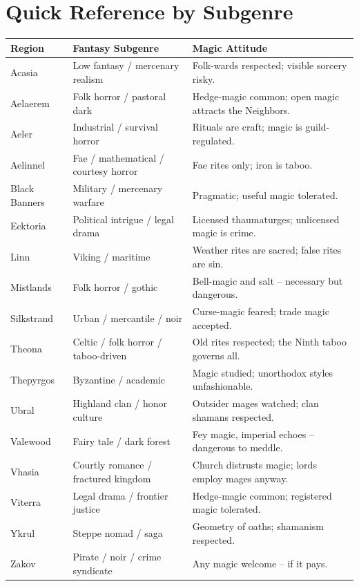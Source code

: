 \section*{Quick Reference by Subgenre}
{\small
\begin{longtable}{lll}
\toprule
\textbf{Region} & \textbf{Fantasy Subgenre} & \textbf{Magic Attitude} \\
\midrule
Acasia & Low fantasy / mercenary realism & Folk-wards respected; visible sorcery risky. \\
Aelaerem & Folk horror / pastoral dark & Hedge-magic common; open magic attracts the Neighbors. \\
Aeler & Industrial / survival horror & Rituals are craft; magic is guild-regulated. \\
Aelinnel & Fae / mathematical / courtesy horror & Fae rites only; iron is taboo. \\
Black Banners & Military / mercenary warfare & Pragmatic; useful magic tolerated. \\
Ecktoria & Political intrigue / legal drama & Licensed thaumaturges; unlicensed magic is crime. \\
Linn & Viking / maritime & Weather rites are sacred; false rites are sin. \\
Mistlands & Folk horror / gothic & Bell-magic and salt -- necessary but dangerous. \\
Silkstrand & Urban / mercantile / noir & Curse-magic feared; trade magic accepted. \\
Theona & Celtic / folk horror / taboo-driven & Old rites respected; the Ninth taboo governs all. \\
Thepyrgos & Byzantine / academic & Magic studied; unorthodox styles unfashionable. \\
Ubral & Highland clan / honor culture & Outsider mages watched; clan shamans respected. \\
Valewood & Fairy tale / dark forest & Fey magic, imperial echoes -- dangerous to meddle. \\
Vhasia & Courtly romance / fractured kingdom & Church distrusts magic; lords employ mages anyway. \\
Viterra & Legal drama / frontier justice & Hedge-magic common; registered magic tolerated. \\
Ykrul & Steppe nomad / saga & Geometry of oaths; shamanism respected. \\
Zakov & Pirate / noir / crime syndicate & Any magic welcome -- if it pays. \\
\bottomrule
\end{longtable}
}

